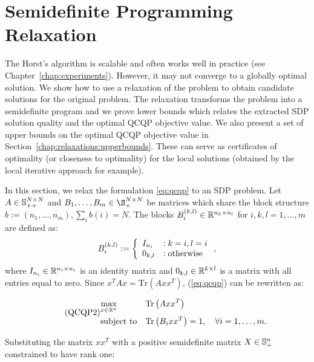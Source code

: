 \section{Semidefinite Programming Relaxation}\label{chap:relaxations:sdp}
The Horst's algorithm is scalable and often works well in
practice (see Chapter~\ref{chap:experiments}).
However, it may not converge to a globally optimal
solution. We show how to use a relaxation of the problem to obtain
candidate solutions for the original problem. The relaxation
transforms the problem into a  semidefinite program and we
prove  lower bounds which relates the extracted SDP solution
quality and the optimal QCQP objective value. We also present
a set of upper bounds on the optimal QCQP objective value in Section~\ref{chap:relaxations:upperbounds}.
These can serve as certificates of optimality (or closeness to
optimality) for the local solutions (obtained by the local iterative approach for example).

In this section, we relax the formulation \ref{eq:qcqp} to an SDP problem.
Let $A \in \mathbb{S}_{++}^{N \times N}$ and $B_1, \ldots, B_m \in \S_{+}^{N \times N}$ be matrices
which share the block structure $b := \left(n_1, \ldots, n_m\right), \sum_i b\left(i\right) = N$.
The blocks $B_i^{(k,l)} \in \mathbb{R}^{n_k \times n_l}$ for $i,k,l = 1,\ldots,m$ are defined as:
$$
B_i^{(k,l)} := \left\{
     \begin{array}{l l}
       I_{n_i} & : k = i, l = i\\
       0_{k,l} & : \textnormal{otherwise}
     \end{array}
   \right.,
$$
where $I_{n_i} \in \mathbb{R}^{n_i \times n_i}$ is an identity matrix and $0_{k,l} \in \mathbb{R}^{k \times l}$ is
a matrix with all entries equal to zero. Since $x^T A x = \mathrm{Tr}\left( A x x^T\right)$, (\ref{eq:qcqp})
can be rewritten as:

\begin{equation}\label{eq:qcqp2}
\tag{QCQP2}
\begin{aligned}
& \underset{x \in \mathbb{R}^n}{\text{max}}
& &\mathrm{Tr}\left(A x x^T\right) \\
& \text{subject to}
& &\mathrm{Tr}\left(B_i x x^T\right) = 1,  \quad\forall i =1,\ldots,m.\\
\end{aligned}
\end{equation}

Substituting the matrix $x x^T$ with a positive semidefinite matrix $X \in \mathbb{S}_{+}^{n}$ constrained to have rank one:

